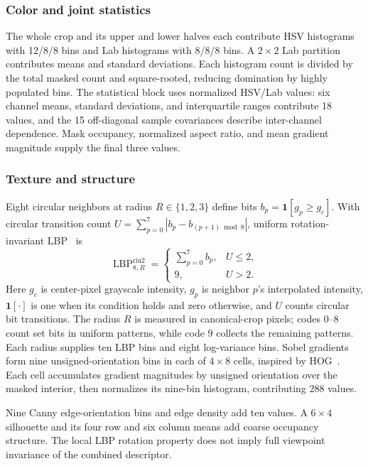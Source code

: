 \documentclass[conference]{IEEEtran}
\begin{document}
\subsubsection{Color and joint statistics}
The whole crop and its upper and lower halves each contribute HSV histograms with 12/8/8 bins and Lab histograms with 8/8/8 bins. A $2\times2$ Lab partition contributes means and standard deviations. Each histogram count is divided by the total masked count and square-rooted, reducing domination by highly populated bins. The statistical block uses normalized HSV/Lab values: six channel means, standard deviations, and interquartile ranges contribute 18 values, and the 15 off-diagonal sample covariances describe inter-channel dependence. Mask occupancy, normalized aspect ratio, and mean gradient magnitude supply the final three values.

\subsubsection{Texture and structure}
Eight circular neighbors at radius $R\in\{1,2,3\}$ define bits $b_p=\mathbf1[g_p\ge g_c]$. With circular transition count $U=\sum_{p=0}^{7}|b_p-b_{(p+1)\bmod8}|$, uniform rotation-invariant LBP~\cite{ojala2002} is
\begin{equation}
\operatorname{LBP}_{8,R}^{\mathrm{riu2}}=
\begin{cases}\sum_{p=0}^7b_p,&U\le2,\\9,&U>2.\end{cases}
\end{equation}
Here $g_c$ is center-pixel grayscale intensity, $g_p$ is neighbor $p$'s interpolated intensity, $\mathbf1[\cdot]$ is one when its condition holds and zero otherwise, and $U$ counts circular bit transitions. The radius $R$ is measured in canonical-crop pixels; codes 0--8 count set bits in uniform patterns, while code 9 collects the remaining patterns. Each radius supplies ten LBP bins and eight log-variance bins. Sobel gradients form nine unsigned-orientation bins in each of $4\times8$ cells, inspired by HOG~\cite{dalal2005}. Each cell accumulates gradient magnitudes by unsigned orientation over the masked interior, then normalizes its nine-bin histogram, contributing 288 values.

Nine Canny edge-orientation bins and edge density add ten values. A $6\times4$ silhouette and its four row and six column means add coarse occupancy structure. The local LBP rotation property does not imply full viewpoint invariance of the combined descriptor.
\end{document}

